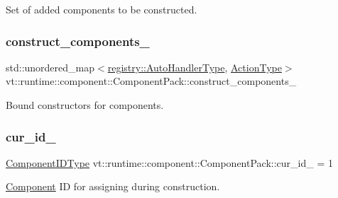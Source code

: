 Set of added components to be constructed. 

\mbox{\label{structvt_1_1runtime_1_1component_1_1_component_pack_a0c54536ec06304f279f09205f83c8cd7}} 
\subsubsection{\texorpdfstring{construct\+\_\+components\+\_\+}{construct\_components\_}}
{\footnotesize\ttfamily std\+::unordered\+\_\+map$<$\hyperlink{namespacevt_1_1runtime_1_1component_1_1registry_a9b86518797c7bb91babf0ca8ee7d06e6}{registry\+::\+Auto\+Handler\+Type}, \hyperlink{namespacevt_ae0a5a7b18cc99d7b732cb4d44f46b0f3}{Action\+Type}$>$ vt\+::runtime\+::component\+::\+Component\+Pack\+::construct\+\_\+components\+\_\+\hspace{0.3cm}{\ttfamily [private]}}



Bound constructors for components. 

\mbox{\label{structvt_1_1runtime_1_1component_1_1_component_pack_a4163295f78b9dbd6e135783cf6d2ccce}} 
\subsubsection{\texorpdfstring{cur\+\_\+id\+\_\+}{cur\_id\_}}
{\footnotesize\ttfamily \hyperlink{namespacevt_ab6ac935c168b809c422d5121da4f2700}{Component\+I\+D\+Type} vt\+::runtime\+::component\+::\+Component\+Pack\+::cur\+\_\+id\+\_\+ = 1\hspace{0.3cm}{\ttfamily [private]}}



\hyperlink{structvt_1_1runtime_1_1component_1_1_component}{Component} ID for assigning during construction. 

